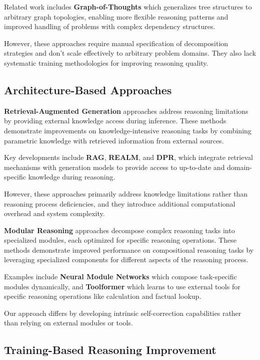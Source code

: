 \documentclass[10pt,twocolumn]{article}
\begin{document}
Related work includes \textbf{Graph-of-Thoughts} which generalizes tree structures to arbitrary graph topologies, enabling more flexible reasoning patterns and improved handling of problems with complex dependency structures.

However, these approaches require manual specification of decomposition strategies and don't scale effectively to arbitrary problem domains. They also lack systematic training methodologies for improving reasoning quality.

\subsection{Architecture-Based Approaches}

\textbf{Retrieval-Augmented Generation} approaches address reasoning limitations by providing external knowledge access during inference. These methods demonstrate improvements on knowledge-intensive reasoning tasks by combining parametric knowledge with retrieved information from external sources.

Key developments include \textbf{RAG}, \textbf{REALM}, and \textbf{DPR}, which integrate retrieval mechanisms with generation models to provide access to up-to-date and domain-specific knowledge during reasoning.

However, these approaches primarily address knowledge limitations rather than reasoning process deficiencies, and they introduce additional computational overhead and system complexity.

\textbf{Modular Reasoning} approaches decompose complex reasoning tasks into specialized modules, each optimized for specific reasoning operations. These methods demonstrate improved performance on compositional reasoning tasks by leveraging specialized components for different aspects of the reasoning process.

Examples include \textbf{Neural Module Networks} which compose task-specific modules dynamically, and \textbf{Toolformer} which learns to use external tools for specific reasoning operations like calculation and factual lookup.

Our approach differs by developing intrinsic self-correction capabilities rather than relying on external modules or tools.

\subsection{Training-Based Reasoning Improvement}
\end{document}
